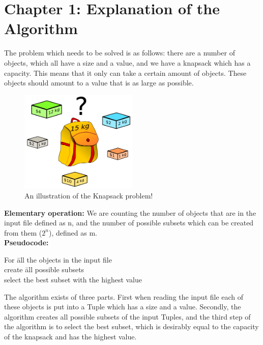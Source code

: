 \documentclass{article}
\begin{document}
\section*{Chapter 1:  Explanation of the Algorithm} 
 \noindent The problem which needs to be solved is as follows: there are a number of objects, which all have a size and a value, and we have a knapsack which has a capacity. This means that it only can take a certain amount of objects. These objects should amount to a value that is as large as possible.\\

\begin{figure}[h!]
  \centering
    
      \includegraphics[width=0.5\textwidth]{Knapsack.png}
  \caption{An illustration of the Knapsack problem!}
\end{figure}





\textbf{Elementary operation:} We are counting the number of objects that are in the input file defined as n, and the number of possible subsets which can be created from them ($2^n$), defined as m.\\

\noindent \textbf{Pseudocode:}
\begin{tabbing}
For \= all the objects in the input file \\
\> create \= all possible subsets	\\
\> select the best subset with the highest value\\
\end{tabbing}

The algorithm exists of three parts. First when reading the input file each of these objects is put into a Tuple which has a size and a value. Secondly, the algorithm creates all possible subsets of the input Tuples, and the third step of the algorithm is to select the best subset, which is desirably equal to the capacity of the knapsack and has the highest value. \\
 
\end{document}

